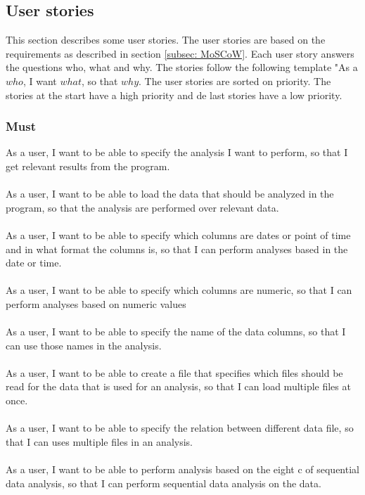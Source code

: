 \subsection{User stories}
\label{subsec:User-stories}
This section describes some user stories. The user stories are based on the requirements as described in section \ref{subsec: MoSCoW}. Each user story answers the questions who, what and why. The stories follow the following template "As a $who$, I want $what$, so that $why$. The user stories are sorted on priority. The stories at the start have a high priority and de last stories have a low priority.
\subsubsection{Must}
As a user, I want to be able to specify the analysis I want to perform, so that I get relevant results from the program. 
\\\\
As a user, I want to be able to load the data that should be analyzed in the program, so that the analysis are performed over relevant data. 
\\\\
As a user, I want to be able to specify which columns are dates or point of time and in what format the columns is, so that I can perform analyses based in the date or time.
\\\\
As a user, I want to be able to specify which columns are numeric, so that I can perform analyses based on numeric values
\\\\
As a user, I want to be able to specify the name of the data columns, so that I can use those names in the analysis.
\\\\
As a user, I want to be able to create a file that specifies which files should be read for the data that is used for an analysis, so that I can load multiple files at once.
\\\\
As a user, I want to be able to specify the relation between different data file, so that I can uses multiple files in an analysis.
\\\\
As a user, I want to be able to perform analysis based on the eight c of sequential data analysis, so that I can perform sequential data analysis on the data.
\\\\
